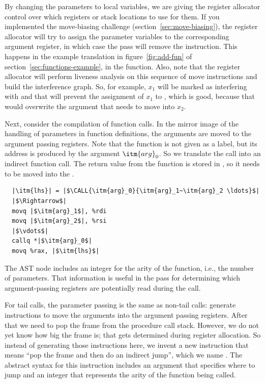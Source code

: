 \documentclass[7x10]{TimesAPriori_MIT}%
\numberwithin{theorem}{chapter}
\numberwithin{definition}{chapter}
\numberwithin{equation}{chapter}
\begin{document}
By changing the parameters to local variables, we are giving the
register allocator control over which registers or stack locations to
use for them. If you implemented the move-biasing challenge
(section~\ref{sec:move-biasing}), the register allocator will try to
assign the parameter variables to the corresponding argument register,
in which case the  pass will remove the
 instruction. This happens in the example translation in
figure~\ref{fig:add-fun} of section~\ref{sec:functions-example}, in
the  function.
%
Also, note that the register allocator will perform liveness analysis
on this sequence of move instructions and build the interference
graph. So, for example, $x_1$ will be marked as interfering with
 and that will prevent the assignment of $x_1$ to
, which is good, because that would overwrite the argument
that needs to move into $x_2$.

Next, consider the compilation of function calls. In the mirror image
of the handling of parameters in function definitions, the arguments
are moved to the argument passing registers.  Note that the function
is not given as a label, but its address is produced by the argument
$\itm{arg}_0$. So we translate the call into an indirect function
call. The return value from the function is stored in , so
it needs to be moved into the .
\begin{lstlisting}
  |\itm{lhs}| = |$\CALL{\itm{arg}_0}{\itm{arg}_1~\itm{arg}_2 \ldots}$|
  |$\Rightarrow$|
  movq |$\itm{arg}_1$|, %rdi
  movq |$\itm{arg}_2$|, %rsi
  |$\vdots$|
  callq *|$\itm{arg}_0$|
  movq %rax, |$\itm{lhs}$|
\end{lstlisting}
The  AST node includes an integer for the arity of
the function, i.e., the number of parameters. That information is
useful in the  pass for determining which
argument-passing registers are potentially read during the call.

For tail calls, the parameter passing is the same as non-tail calls:
generate instructions to move the arguments into the argument
passing registers.  After that we need to pop the frame from the
procedure call stack.  However, we do not yet know how big the frame
is; that gets determined during register allocation. So instead of
generating those instructions here, we invent a new instruction that
means ``pop the frame and then do an indirect jump'', which we name
. The abstract syntax for this instruction includes an
argument that specifies where to jump and an integer that represents
the arity of the function being called.
\end{document}
